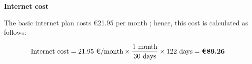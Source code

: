 \textbf{Internet cost}

\vspace{-5pt}

The basic internet plan costs €21.95 per month \cite{orange-fiber-offer}; hence, this cost is calculated as follows:

\vspace{-15pt}

\[
\text{Internet cost} = 
21.95 \text{ €/month} \times 
\dfrac{1 \text{ month}}{30 \text{ days}} \times 
122 \text{ days} = 
\textbf{\text{€}89.26}
\]


\vspace{-5pt}


